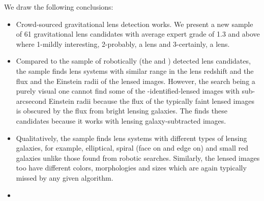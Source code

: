 \documentclass[useAMS,usenatbib,a4paper]{mn2e}
\begin{document}
We draw the following conclusions:

\begin{itemize} 

\item Crowd-sourced gravitational lens detection works. We present a new
sample of 61 gravitational lens candidates with average expert grade of
1.3 and above where 1-mildly interesting, 2-probably, a lens and
3-certainly, a lens.


\item Compared to the sample of robotically (the \rf and \af) detected
lens candidates, the \sw sample finds lens systems with similar range in
the lens redshift and the flux and the Einstein radii of the lensed
images. However, the \sw search being a purely visual one cannot find
some of the \rf-identified-lensed images with sub-arcsecond Einstein
radii because the flux of the typically faint lensed images is obscured
by the flux from bright lensing galaxies. The \rf finds these candidates
because it works with lensing galaxy-subtracted images.

\item Qualitatively, the \sw sample finds lens systems with different
types of lensing galaxies, for example, elliptical, spiral (face on and
edge on) and small red galaxies unlike those found from robotic
searches. Similarly, the lensed images too have different colors,
morphologies and sizes which are again typically missed by any given
algorithm.

\item  

\end{itemize}

\onecolumn
\end{document}
